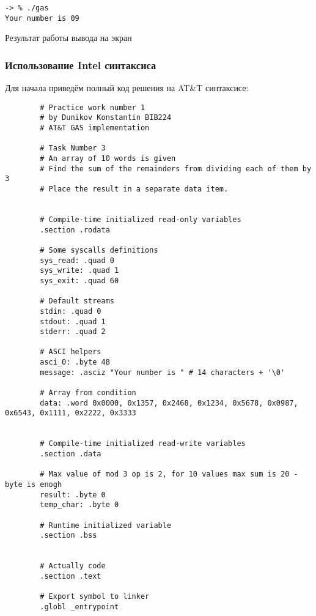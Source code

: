 \documentclass[a4paper]{article}
\begin{document}
  \begin{listing}[H]
    \begin{verbatim}
-> % ./gas 
Your number is 09
    \end{verbatim}
    \caption{Результат работы вывода на экран}
  \end{listing}

  \subsubsection{Использование Intel синтаксиса}

  Для начала приведём полный код решения на AT\&T синтаксисе:

  \begin{listing}[H]
    \begin{verbatim}
        # Practice work number 1 
        # by Dunikov Konstantin BIB224
        # AT&T GAS implementation
        
        # Task Number 3
        # An array of 10 words is given
        # Find the sum of the remainders from dividing each of them by 3
        # Place the result in a separate data item.
        
        
        # Compile-time initialized read-only variables
        .section .rodata
        
        # Some syscalls definitions
        sys_read: .quad 0 
        sys_write: .quad 1
        sys_exit: .quad 60
        
        # Default streams
        stdin: .quad 0
        stdout: .quad 1
        stderr: .quad 2
        
        # ASCI helpers
        asci_0: .byte 48
        message: .asciz "Your number is " # 14 characters + '\0'
        
        # Array from condition
        data: .word 0x0000, 0x1357, 0x2468, 0x1234, 0x5678, 0x0987, 0x6543, 0x1111, 0x2222, 0x3333
        
        
        # Compile-time initialized read-write variables
        .section .data
        
        # Max value of mod 3 op is 2, for 10 values max sum is 20 - byte is enogh
        result: .byte 0
        temp_char: .byte 0
        
        # Runtime initialized variable
        .section .bss
        
        
        # Actually code
        .section .text
        
        # Export symbol to linker
        .globl _entrypoint
        

\end{verbatim}
\end{listing}
\end{document}
